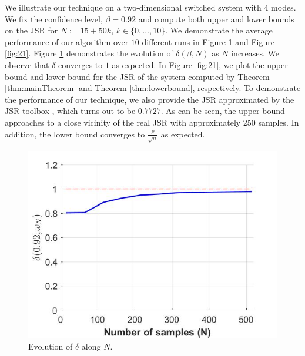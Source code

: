 We illustrate our technique on a two-dimensional switched system with $4$ modes. We fix the confidence level, \mbox{$\beta = 0.92$} and compute both upper and lower bounds on the JSR for $N:=15+50k,\, k \in\{0, \ldots, 10\}.$ We demonstrate the average performance of our algorithm over $10$ different runs in Figure \ref{fig:11} and Figure \ref{fig:21}. Figure \ref{fig:11} demonstrates the evolution of $\delta(\beta, N)$ as $N$ increases. We observe that $\delta$ converges to $1$ as expected. In Figure \ref{fig:21}, we plot the upper bound and lower bound for the JSR of the system computed by Theorem \ref{thm:mainTheorem} and Theorem \ref{thm:lowerbound}, respectively. To demonstrate the performance of our technique, we also provide the JSR approximated by the JSR toolbox \cite{jsrtoolbox}, which turns out to be $0.7727$. As can be seen, the upper bound approaches to a close vicinity of the real JSR with approximately 250 samples. In addition, the lower bound converges to $\frac{\rho}{\sqrt{n}}$ as expected.

\begin{figure}
\begin{center}
\includegraphics[scale=0.35]{delta1.jpg}

\caption{Evolution of $\delta$ along $N$.}
\label{fig:11}
\end{center}
\end{figure}


